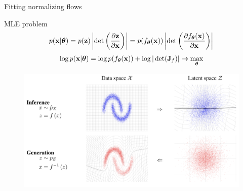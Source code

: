 \begin{frame}{Fitting normalizing flows}
	\begin{block}{MLE problem}
		\vspace{-0.3cm}
		\[
		p(\mathbf{x}|\boldsymbol{\theta}) = p(\mathbf{z}) \left|\det \left(  \frac{\partial \mathbf{z}}{\partial \mathbf{x}} \right) \right|  = p(f_{\boldsymbol{\theta}}(\mathbf{x})) \left|\det \left( \frac{\partial f_{\boldsymbol{\theta}}(\mathbf{x})}{\partial \mathbf{x}} \right) \right|
		\]
		\[
		\log p(\mathbf{x}|\boldsymbol{\theta}) = \log p(f_{\boldsymbol{\theta}}(\mathbf{x})) + \log  |\det (\mathbf{J}_f) | \rightarrow \max_{\boldsymbol{\theta}}
		\]
	\end{block}
	\vspace{-0.2cm}
	\begin{figure}
		\includegraphics[width=0.85\linewidth]{figs/flows_how2}
	\end{figure}
\end{frame}
